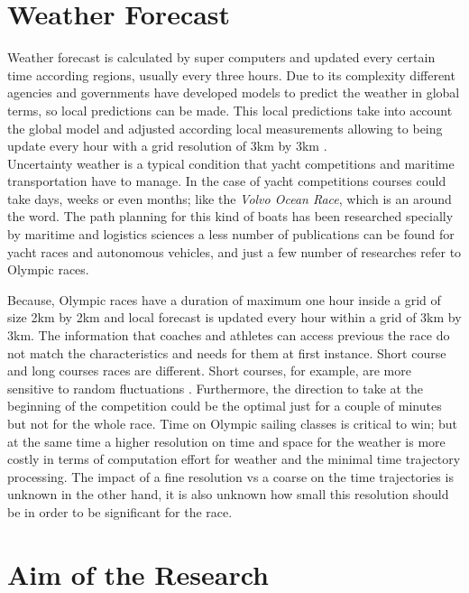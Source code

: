\section{Weather Forecast}
Weather forecast is calculated by super computers and updated every certain time according regions, usually every three hours. Due to its complexity different agencies and governments have developed models to predict the weather in global terms, so local predictions can be made. This local predictions take into account the global model and adjusted according local measurements allowing to being update every hour with a grid resolution of 3km by 3km \cite{warner2010numerical}.
\\

Uncertainty weather is a typical condition that yacht competitions and maritime transportation have to manage. In the case of yacht competitions courses could take days, weeks or even months; like the \textit{Volvo Ocean Race}, which is an around the word. The path planning for this kind of boats has been researched specially by maritime and logistics sciences a less number of publications can be found for yacht races and autonomous vehicles, and just a few number of researches refer to Olympic races. \newline 

 Because, Olympic races have a duration of maximum one hour inside a grid of size 2km by 2km and local forecast is updated every hour within a grid of 3km by 3km. The information that coaches and athletes can access previous the race do not match the characteristics and needs for them at first instance.
 Short course and long courses races are different. Short courses, for example, are more sensitive to random fluctuations \cite{philpott2001optimising}. Furthermore, the direction to take at the beginning of the competition could be the optimal just for a couple of minutes but not for the whole race. Time on Olympic sailing classes is critical to win; but at the same time a higher resolution on time and space for the weather is more costly in terms of computation effort for weather and the minimal time trajectory processing. The impact of a fine resolution vs a coarse on the time trajectories is unknown in the other hand, it is also unknown how small this resolution should be in order to be significant for the  race.
 
 \section{Aim of the Research}
 
